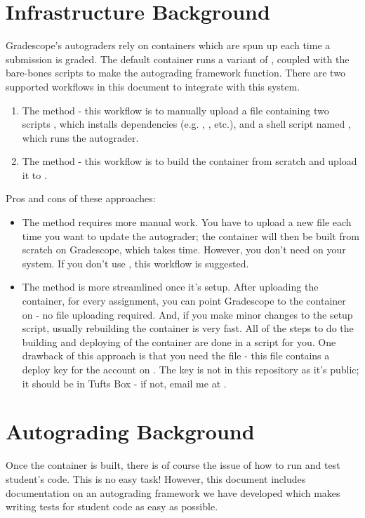 \documentclass[11pt]{report}
\begin{document}
\section*{Infrastructure Background}
Gradescope's autograders rely on  containers which are spun up each time 
a submission is graded. The default container runs a variant of ,
coupled with the bare-bones scripts to make the autograding framework function. There are two 
supported workflows in this document to integrate with this system. 
\begin{enumerate}
      \item The  method - this workflow is to manually upload a  file 
      containing two scripts , which installs dependencies (e.g. , 
      , etc.), and a shell script named , which runs the autograder.
      \item The  method - this workflow is to build the  container from
      scratch and upload it to .
\end{enumerate}
Pros and cons of these approaches:
\begin{itemize}
      \item The  method requires more manual work. You have to upload
      a new  file each time you want to update the autograder; the  container 
      will then be built from scratch on Gradescope, which takes time. However, you don't need 
       on your system. If you don't use , this workflow is suggested. 
      \item The  method is more streamlined once it's setup. After uploading the container, 
      for every assignment, you can point Gradescope to the container on  - no 
       file uploading required. And, if you make minor changes to the setup script, 
      usually rebuilding the container is very fast. All of the steps to do the building and deploying 
      of the container are done in a script for you. One drawback of this approach is that you need 
      the  file - this file contains a deploy key for the  
      account on . The key is not in this repository as it's public; it should be 
      in Tufts Box - if not, email me at .
\end{itemize}

\section*{Autograding Background}
Once the container is built, there is of course the issue of how to run and test student's code. 
This is no easy task! However, this document includes documentation on an autograding framework we have 
developed which makes writing tests for student code as easy as possible. 
\end{document}
